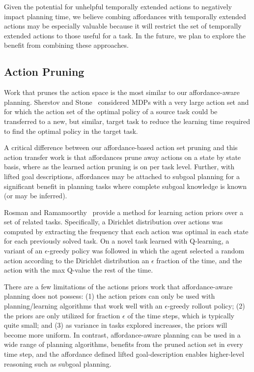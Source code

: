 \documentclass[conference]{IEEEtran}
\begin{document}
Given the potential for unhelpful temporally extended actions to negatively impact planning time, we believe combing affordances with temporally extended actions
may be especially valuable because it will restrict the set of temporally extended actions to those
useful for a task. In the future, we plan to explore the benefit from combining
these approaches.

\subsection{Action Pruning}

Work that prunes the action space is the most similar to our affordance-aware planning.
Sherstov and Stone~\citep{sherstov2005improving} considered MDPs with a very large action set and for which the action
set of the optimal policy of a source task could be transferred to a new, but similar, target
task to reduce the learning time required to find the optimal policy in the target task.

A critical difference between our affordance-based action set pruning and this action transfer
work is that affordances prune away actions on a state by state basis, where
as the learned action pruning is on per task level.
Further, with lifted goal descriptions, affordances may be attached to subgoal planning for a significant
benefit in planning tasks where complete subgoal knowledge is known (or may be inferred).

Rosman and Ramamoorthy~\citep{rosman2012good} provide a method for learning action priors over a set of related tasks. Specifically, a Dirichlet distribution over actions was computed by extracting the frequency that each action was optimal in each state for each previously solved task. On a novel task learned with Q-learning, a variant of an $\epsilon$-greedy policy was followed in which the agent selected a random action according to the Dirichlet distribution an $\epsilon$ fraction of the time, and the action with the max Q-value the rest of the time.

There are a few limitations of the actions priors work that affordance-aware planning does not possess: (1) the action priors can only be used with planning/learning algorithms that work well with an $\epsilon$-greedy rollout policy; (2) the priors are only utilized for fraction $\epsilon$ of the time steps, which is typically quite small; and (3) as variance in tasks explored increases, the priors will become more uniform. In contrast, affordance-aware planning can be used in a wide range of planning algorithms, benefits from the pruned action set in every time step, and the affordance defined lifted goal-description enables higher-level reasoning such as subgoal planning.
\end{document}
